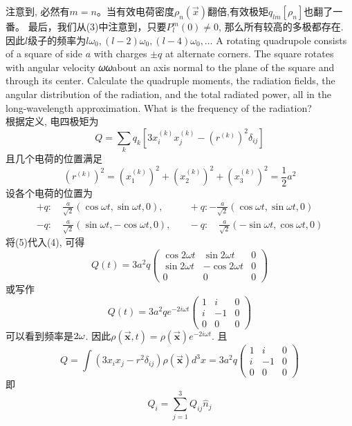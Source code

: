 \documentclass[UTF8,9pt]{ctexart}
\begin{document}
 注意到, 必然有$m=n$。当有效电荷密度$\rho_{n}(\vec{x})$翻倍,有效极矩$q_{l m}\left[\rho_{n}\right]$也翻了一番。
最后，我们从(3)中注意到，只要$P_{l}^{m}(0)\neq0$, 那么所有较高的多极都存在. 因此$l$级子的频率为$l \omega_{0},(l-2) \omega_{0},(l-4) \omega_{0}, \dots$
A rotating quadrupole consists of a square of side $a$ with charges $\pm q$ at alternate corners. The square rotates with angular velocity 𝜔𝜔about an axis normal to the plane of the square and through its center. Calculate the quadruple moments, the radiation fields, the angular distribution of the radiation, and the total radiated power, all in the long-wavelength approximation. What is the frequency of the radiation?\\
根据定义, 电四极矩为\begin{equation}
Q=
\sum_{k} q_{k}\left[3 x_{i}^{(k)} x_{j}^{(k)}-\left(r^{(k)}\right)^{2} \delta_{i j}\right]
\end{equation}
  且几个电荷的位置满足$$
  \left(r^{(k)}\right)^{2}=\left(x_{1}^{(k)}\right)^{2}+\left(x_{2}^{(k)}\right)^{2}+\left(x_{3}^{(k)}\right)^{2}=\frac{1}{2} a^{2}
$$
   设各个电荷的位置为\begin{equation}
  \begin{array}{rl}+q : \quad \frac{a}{\sqrt{2}}(\cos \omega t, \sin \omega t, 0), &\quad+q :-\frac{a}{\sqrt{2}}(\cos \omega t, \sin \omega t, 0) \\ -q : \quad \frac{a}{\sqrt{2}}(\sin \omega t,-\cos \omega t, 0), &\quad-q : \quad \frac{a}{\sqrt{2}}(-\sin \omega t, \cos \omega t, 0)\end{array}
  \end{equation}
将(5)代入(4), 可得$$ Q(t)
=3 a^{2} q \left( \begin{array}{ccc}{\cos 2 \omega t} & {\sin 2 \omega t} & {0} \\ {\sin 2 \omega t} & {-\cos 2 \omega t} & {0} \\ {0} & {0} & {0}\end{array}\right)
 $$
或写作$$ 
Q(t)=3 a^{2} q e^{-2 i \omega t} \left( \begin{array}{rrr}{1} & {i} & {0} \\ {i} & {-1} & {0} \\ {0} & {0} & {0}\end{array}\right)
 $$可以看到频率是$2\omega$. 因此$\rho(\overrightarrow{\boldsymbol{x}}, t)=\rho(\overrightarrow{\boldsymbol{x}}) e^{-2 i \omega t}$. 且$$ 
Q=\int\left(3 x_{i} x_{j}-r^{2} \delta_{i j}\right) \rho(\overrightarrow{\boldsymbol{x}}) d^{3} x=3 a^{2} q \left( \begin{array}{ccc}{1} & {i} & {0} \\ {i} & {-1} & {0} \\ {0} & {0} & {0}\end{array}\right)
 $$即$$ 
 Q_{i}=\sum_{j=1}^{3} Q_{i j} \hat{n}_{j}
  $$
\end{document}
